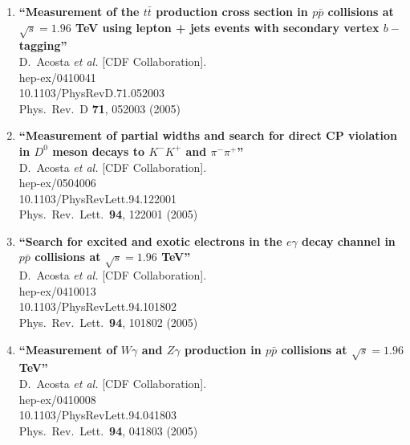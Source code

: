\documentclass{article}
\begin{document}
\begin{enumerate}
\item%
{\bf ``Measurement of the $t\bar{t}$ production cross section in $p\bar{p}$ collisions at $\sqrt{s} = 1.96$ TeV using lepton + jets events with secondary vertex $b-$tagging''}
  \\{}D.~Acosta {\it et al.}  [CDF Collaboration].
  \\{}hep-ex/0410041
    \\{}10.1103/PhysRevD.71.052003
\\{}Phys.\ Rev.\ D {\bf 71}, 052003 (2005) %


\item%
{\bf ``Measurement of partial widths and search for direct CP violation in $D^0$ meson decays to $K^- K^+$ and $\pi^- \pi^+$''}
  \\{}D.~Acosta {\it et al.}  [CDF Collaboration].
  \\{}hep-ex/0504006
    \\{}10.1103/PhysRevLett.94.122001
\\{}Phys.\ Rev.\ Lett.\  {\bf 94}, 122001 (2005) %


\item%
{\bf ``Search for excited and exotic electrons in the $e \gamma$ decay channel in $p \bar{p}$ collisions at $\sqrt{s} = 1.96$ TeV''}
  \\{}D.~Acosta {\it et al.}  [CDF Collaboration].
  \\{}hep-ex/0410013
    \\{}10.1103/PhysRevLett.94.101802
\\{}Phys.\ Rev.\ Lett.\  {\bf 94}, 101802 (2005) %


\item%
{\bf ``Measurement of $W \gamma$ and $Z \gamma$ production in $p\bar{p}$ collisions at $\sqrt{s} = 1.96$ TeV''}
  \\{}D.~Acosta {\it et al.}  [CDF Collaboration].
  \\{}hep-ex/0410008
    \\{}10.1103/PhysRevLett.94.041803
\\{}Phys.\ Rev.\ Lett.\  {\bf 94}, 041803 (2005) %



\end{enumerate}
\end{document}
